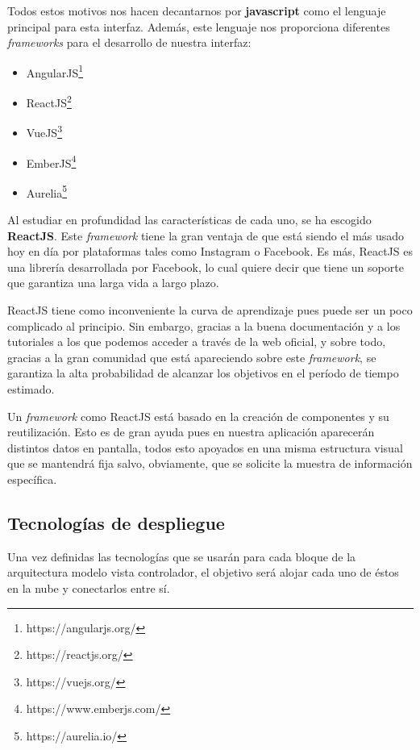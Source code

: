 Todos estos motivos nos hacen decantarnos por \textbf{javascript} como el lenguaje principal para esta interfaz. Además, este lenguaje nos proporciona diferentes \textit{frameworks} para el desarrollo de nuestra interfaz\cite{framework}:

\begin{itemize}
    \item AngularJS\footnote{https://angularjs.org/}
    \item ReactJS\footnote{https://reactjs.org/}
    \item VueJS\footnote{https://vuejs.org/}
    \item EmberJS\footnote{https://www.emberjs.com/}
    \item Aurelia\footnote{https://aurelia.io/}
\end{itemize}

Al estudiar en profundidad las características de cada uno\cite{framework2}, se ha escogido \textbf{ReactJS}. Este \textit{framework} tiene la gran ventaja de que está siendo el más usado hoy en día por plataformas tales como Instagram o Facebook. Es más, ReactJS es una librería desarrollada por Facebook, lo cual quiere decir que tiene un soporte que garantiza una larga vida a largo plazo.

ReactJS tiene como inconveniente la curva de aprendizaje pues puede ser un poco complicado al principio. Sin embargo, gracias a la buena documentación y a los tutoriales a los que podemos acceder a través de la web oficial, y sobre todo, gracias a la gran comunidad que está apareciendo sobre este \textit{framework}, se garantiza la alta probabilidad de alcanzar los objetivos en el período de tiempo estimado.

Un \textit{framework} como ReactJS está basado en la creación de componentes y su reutilización. Esto es de gran ayuda pues en nuestra aplicación aparecerán distintos datos en pantalla, todos esto apoyados en una misma estructura visual que se mantendrá fija salvo, obviamente, que se solicite la muestra de información específica.

\subsection{Tecnologías de despliegue}

Una vez definidas las tecnologías que se usarán para cada bloque de la arquitectura modelo vista controlador, el objetivo será alojar cada uno de éstos en la nube y conectarlos entre sí. 

